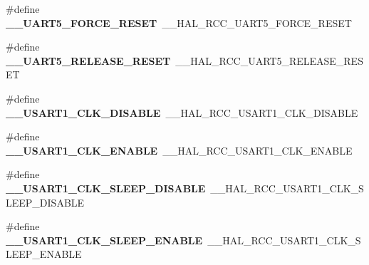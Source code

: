\begin{DoxyCompactItemize}
\item 
\mbox{\label{group___h_a_l___r_c_c___aliased_gaa862c1dd316cef6f49cf1d8b75fc98ab}} 
\#define {\bfseries \+\_\+\+\_\+\+U\+A\+R\+T5\+\_\+\+F\+O\+R\+C\+E\+\_\+\+R\+E\+S\+ET}~\+\_\+\+\_\+\+H\+A\+L\+\_\+\+R\+C\+C\+\_\+\+U\+A\+R\+T5\+\_\+\+F\+O\+R\+C\+E\+\_\+\+R\+E\+S\+ET
\item 
\mbox{\label{group___h_a_l___r_c_c___aliased_gac1d6aac067f40a8881b272393db61725}} 
\#define {\bfseries \+\_\+\+\_\+\+U\+A\+R\+T5\+\_\+\+R\+E\+L\+E\+A\+S\+E\+\_\+\+R\+E\+S\+ET}~\+\_\+\+\_\+\+H\+A\+L\+\_\+\+R\+C\+C\+\_\+\+U\+A\+R\+T5\+\_\+\+R\+E\+L\+E\+A\+S\+E\+\_\+\+R\+E\+S\+ET
\item 
\mbox{\label{group___h_a_l___r_c_c___aliased_gaa5da6139eb7a5c1432f3bbdb29021f03}} 
\#define {\bfseries \+\_\+\+\_\+\+U\+S\+A\+R\+T1\+\_\+\+C\+L\+K\+\_\+\+D\+I\+S\+A\+B\+LE}~\+\_\+\+\_\+\+H\+A\+L\+\_\+\+R\+C\+C\+\_\+\+U\+S\+A\+R\+T1\+\_\+\+C\+L\+K\+\_\+\+D\+I\+S\+A\+B\+LE
\item 
\mbox{\label{group___h_a_l___r_c_c___aliased_gae10e7a83f9766bc578dbc39727751fa8}} 
\#define {\bfseries \+\_\+\+\_\+\+U\+S\+A\+R\+T1\+\_\+\+C\+L\+K\+\_\+\+E\+N\+A\+B\+LE}~\+\_\+\+\_\+\+H\+A\+L\+\_\+\+R\+C\+C\+\_\+\+U\+S\+A\+R\+T1\+\_\+\+C\+L\+K\+\_\+\+E\+N\+A\+B\+LE
\item 
\mbox{\label{group___h_a_l___r_c_c___aliased_gaa4dced1323153e27e9c29faebee35ddb}} 
\#define {\bfseries \+\_\+\+\_\+\+U\+S\+A\+R\+T1\+\_\+\+C\+L\+K\+\_\+\+S\+L\+E\+E\+P\+\_\+\+D\+I\+S\+A\+B\+LE}~\+\_\+\+\_\+\+H\+A\+L\+\_\+\+R\+C\+C\+\_\+\+U\+S\+A\+R\+T1\+\_\+\+C\+L\+K\+\_\+\+S\+L\+E\+E\+P\+\_\+\+D\+I\+S\+A\+B\+LE
\item 
\mbox{\label{group___h_a_l___r_c_c___aliased_ga6378b19a4a228da0e399b703b018f10c}} 
\#define {\bfseries \+\_\+\+\_\+\+U\+S\+A\+R\+T1\+\_\+\+C\+L\+K\+\_\+\+S\+L\+E\+E\+P\+\_\+\+E\+N\+A\+B\+LE}~\+\_\+\+\_\+\+H\+A\+L\+\_\+\+R\+C\+C\+\_\+\+U\+S\+A\+R\+T1\+\_\+\+C\+L\+K\+\_\+\+S\+L\+E\+E\+P\+\_\+\+E\+N\+A\+B\+LE
\item 
\mbox{\label{group___h_a_l___r_c_c___aliased_gaf29da865725f4aa165fa9f551c40025e}} 

\end{DoxyCompactItemize}

